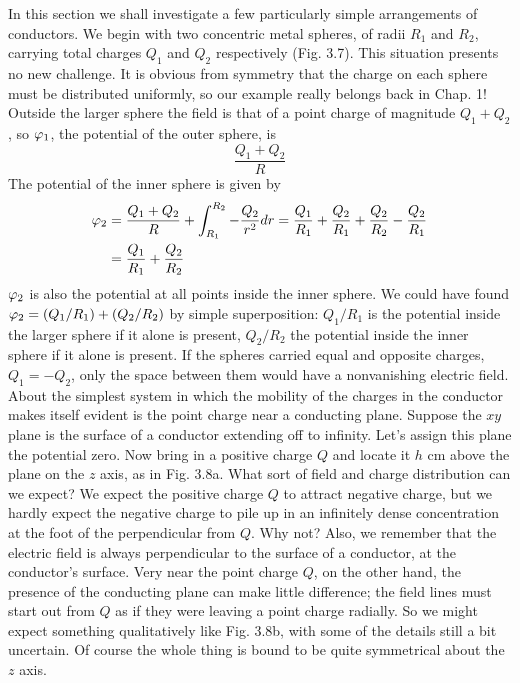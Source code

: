 In this section we shall investigate a few particularly simple arrangements
of conductors. We begin with two concentric metal
spheres, of radii $R_1$ and $R_2$, carrying total charges $Q_1$ and $Q_2$ respectively
(Fig. 3.7). This situation presents no new challenge. It is
obvious from symmetry that the charge on each sphere must be distributed
uniformly, so our example really belongs back in Chap. 1!
Outside the larger sphere the field is that of a point charge of magnitude
$Q_1 + Q_2$, so $\varphi_1$, the potential of the outer sphere, is
\begin{equation*}
  \frac{Q_1+Q_2}{R}
\end{equation*}
The potential of the inner sphere is given by
\begin{align}
\begin{split}
  \varphi_2 &= \frac{Q_1+Q_2}{R} + \int_{R_1}^{R_2} -\frac{Q_2}{r^2}d r
         = \frac{Q_1}{R_1}+\frac{Q_2}{R_1}+\frac{Q_2}{R_2}-\frac{Q_2}{R_1} \\
       &=\frac{Q_1}{R_1}+\frac{Q_2}{R_2}
\end{split}
\end{align}
$\varphi_2$ is also the potential at all points inside the inner sphere. We could
have found $\varphi_2 = (Q_1/R_1) + (Q_2/R_2)$ by simple superposition:
$Q_1/R_1$ is the potential inside the larger sphere if it alone is present,
$Q_2/R_2$ the potential inside the inner sphere if it alone is present. If
the spheres carried equal and opposite charges, $Q_1 = - Q_2$, only the
space between them would have a nonvanishing electric field.
About the simplest system in which the mobility of the charges in
the conductor makes itself evident is the point charge near a conducting
plane. Suppose the $xy$ plane is the surface of a conductor
extending off to infinity. Let's assign this plane the potential zero.
Now bring in a positive charge $Q$ and locate it $h$ cm above the plane
on the $z$ axis, as in Fig. 3.8a. What sort of field and charge distribution
can we expect? We expect the positive charge $Q$ to attract negative
charge, but we hardly expect the negative charge to pile up in an
infinitely dense concentration at the foot of the perpendicular from $Q$.
Why not? Also, we remember that the electric field is always perpendicular
to the surface of a conductor, at the conductor's surface.
Very near the point charge $Q$, on the other hand, the presence of the
conducting plane can make little difference; the field lines must start
out from $Q$ as if they were leaving a point charge radially. So we
might expect something qualitatively like Fig. 3.8b, with some of the
details still a bit uncertain. Of course the whole thing is bound to
be quite symmetrical about the $z$ axis.


